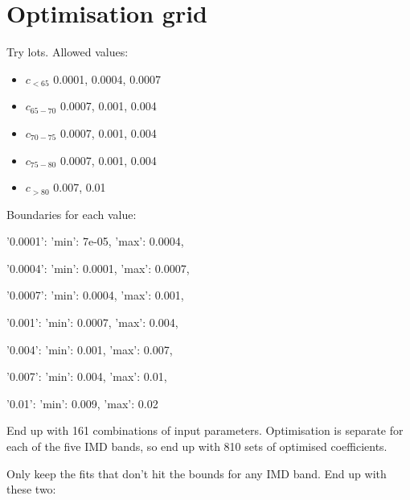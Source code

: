 \documentclass[12pt]{extarticle}
\begin{document}
\section{Optimisation grid}

Try lots. Allowed values:
\begin{itemize}
    \item $c_{<65}$ 0.0001, 0.0004, 0.0007
    \item $c_{65-70}$ 0.0007, 0.001, 0.004
    \item $c_{70-75}$ 0.0007, 0.001, 0.004
    \item $c_{75-80}$ 0.0007, 0.001, 0.004
    \item $c_{>80}$ 0.007, 0.01
\end{itemize}

Boundaries for each value:
\begin{itemize}
    \item {'0.0001': {'min': 7e-05, 'max': 0.0004},
    \item '0.0004': {'min': 0.0001, 'max': 0.0007},
    \item '0.0007': {'min': 0.0004, 'max': 0.001},
    \item '0.001': {'min': 0.0007, 'max': 0.004},
    \item '0.004': {'min': 0.001, 'max': 0.007},
    \item '0.007': {'min': 0.004, 'max': 0.01},
    \item '0.01': {'min': 0.009, 'max': 0.02}}
\end{itemize}

End up with 161 combinations of input parameters. Optimisation is separate for each of the five IMD bands, so end up with 810 sets of optimised coefficients. 

Only keep the fits that don't hit the bounds for any IMD band. End up with these two:
\end{document}

